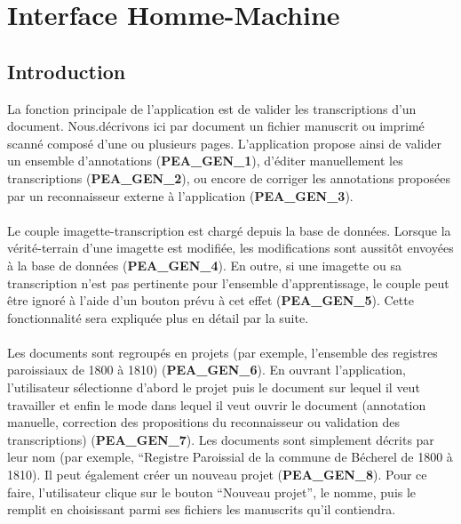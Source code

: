 \section{Interface Homme-Machine}

\subsection{Introduction}

La fonction principale de l’application est de valider les transcriptions d’un document.
Nous.décrivons ici par document un fichier manuscrit ou imprimé scanné composé d’une ou plusieurs pages. L’application propose ainsi de valider un ensemble d’annotations
(\textbf{PEA\_GEN\_1}), d’éditer manuellement les transcriptions
(\textbf{PEA\_GEN\_2}), ou encore de corriger les annotations proposées par un
reconnaisseur externe à l’application (\textbf{PEA\_GEN\_3}).

\paragraph{}
Le couple imagette-transcription est chargé depuis la base de données. Lorsque
la vérité-terrain d’une imagette est modifiée, les modifications sont aussitôt
envoyées à la base de données (\textbf{PEA\_GEN\_4}). En outre, si une
imagette ou sa transcription n’est pas pertinente pour l’ensemble
d’apprentissage, le couple peut être ignoré à l’aide d’un bouton prévu à cet
effet (\textbf{PEA\_GEN\_5}). Cette fonctionnalité sera expliquée plus en
détail par la suite.

\paragraph{}
Les documents sont regroupés en projets (par exemple, l’ensemble des registres
paroissiaux de 1800 à 1810) (\textbf{PEA\_GEN\_6}). En ouvrant l’application,
l’utilisateur sélectionne d’abord le projet puis le document sur lequel il
veut travailler et enfin le mode dans lequel il veut ouvrir le document 
(annotation manuelle, correction des propositions du reconnaisseur ou validation 
des transcriptions) (\textbf{PEA\_GEN\_7}). Les documents sont simplement décrits 
par leur nom (par exemple, “Registre Paroissial de la commune de Bécherel de 
1800 à 1810).  Il peut également créer un nouveau
projet (\textbf{PEA\_GEN\_8}). Pour ce faire, l’utilisateur clique sur le 
bouton “Nouveau projet”, le nomme, puis le remplit en choisissant parmi 
ses fichiers les manuscrits qu’il contiendra.

